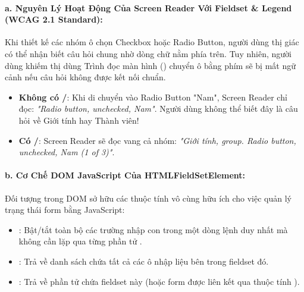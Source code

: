 \paragraph{a. Nguyên Lý Hoạt Động Của Screen Reader Với Fieldset \& Legend (WCAG 2.1 Standard):}
Khi thiết kế các nhóm ô chọn Checkbox hoặc Radio Button, người dùng thị giác có thể nhận biết câu hỏi chung nhờ dòng chữ nằm phía trên. Tuy nhiên, người dùng khiếm thị dùng Trình đọc màn hình () chuyển ô bằng phím  sẽ bị mất ngữ cảnh nếu câu hỏi không được kết nối chuẩn.
\begin{itemize}[leftmargin=1.5em, itemsep=3pt, parsep=0pt]
    \item \textbf{Không có /}: Khi di chuyển vào Radio Button "Nam", Screen Reader chỉ đọc: \textit{"Radio button, unchecked, Nam"}. Người dùng không thể biết đây là câu hỏi về Giới tính hay Thành viên!
    \item \textbf{Có /}: Screen Reader sẽ đọc vang cả nhóm: \textit{"Giới tính, group. Radio button, unchecked, Nam (1 of 3)"}.
\end{itemize}

\paragraph{b. Cơ Chế DOM JavaScript Của HTMLFieldSetElement:}
Đối tượng  trong DOM sở hữu các thuộc tính vô cùng hữu ích cho việc quản lý trạng thái form bằng JavaScript:
\begin{itemize}[leftmargin=1.5em, itemsep=3pt, parsep=0pt]
    \item {}: Bật/tắt toàn bộ các trường nhập con trong một dòng lệnh duy nhất mà không cần lặp qua từng phần tử .
    \item {}: Trả về danh sách  chứa tất cả các ô nhập liệu bên trong fieldset đó.
    \item {}: Trả về phần tử  chứa fieldset này (hoặc form được liên kết qua thuộc tính ).
\end{itemize}

